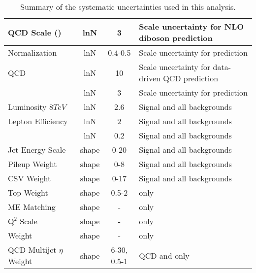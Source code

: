 \begin{frame}
\begin{table}[htbp]
\begin{tabular}{|l|c|c|l|}
		QCD Scale (\VV)                                   & lnN   & 3           & Scale uncertainty for NLO diboson prediction \\
		\hline
		\Wjets Normalization                              & lnN   & 0.4-0.5     & Scale uncertainty for \Wjets prediction \\
		QCD                                               & lnN   & 10          & Scale uncertainty for data-driven QCD prediction \\
		\ttbar                                            & lnN   & 3           & Scale uncertainty for \ttbar prediction \\
		\hline
		Luminosity $8\unit{TeV}$                          & lnN   & 2.6         & Signal and all backgrounds \\
		Lepton Efficiency                                 & lnN   & 2           & Signal and all backgrounds \\
		\ETslash                                          & lnN   & 0.2         & Signal and all backgrounds \\
		Jet Energy Scale                                  & shape & 0-20        & Signal and all backgrounds \\
		Pileup Weight                                     & shape & 0-8         & Signal and all backgrounds \\
		CSV Weight                                        & shape & 0-17        & Signal and all backgrounds \\
		Top \pt Weight                                    & shape & 0.5-2       & \ttbar only \\
		ME Matching                                       & shape & -           & \Wjets only \\
		$\text{Q}^{2}$ Scale                              & shape & -           & \Wjets only \\
		\costhetal Weight                                 & shape & -           & \Wjets only \\
		QCD Multijet $\eta$ Weight                        & shape & 6-30, 0.5-1 & QCD and \Wjets only \\
		\hline
	\end{tabular}
    \caption{Summary of the systematic uncertainties used in this analysis.}
    \label{tab:EffectOfSys}
\end{table}
\end{frame}